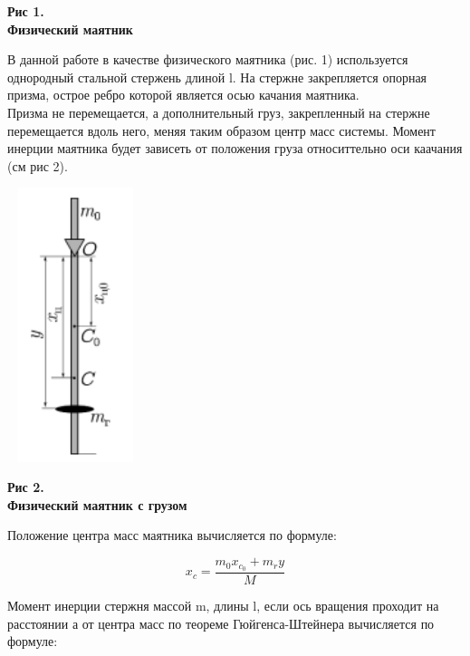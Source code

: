 \begin{flushright}
{\scriptsize \textbf{Рис 1.}\\ \textbf {Физический маятник}}
\end{flushright}

    
    В данной работе в качестве физического маятника (рис. 1)
    используется однородный стальной стержень длиной l. На
    стержне закрепляется опорная призма, острое ребро которой
    является осью качания маятника.\\
    Призма не перемещается, а дополнительный груз, закрепленный на стержне перемещается вдоль него, меняя таким образом центр масс системы. Момент инерции маятника будет зависеть от положения груза относиттельно оси каачания (см рис 2).\\
    
\begin{center}
\includegraphics[width=4cm, height=8cm]{phys_mayat_2}
\end{center}

\begin{flushright}
{\scriptsize \textbf{Рис 2.}\\ \textbf {Физический маятник с грузом}}
\end{flushright}
    
    Положение центра масс маятника вычисляется по формуле:

\begin{equation} \label{центр масс}
    x_{c} = \frac{m_{0}x_{c_0} + m_{r}y}{M}
\end{equation}


    Момент инерции стержня массой m, длины l, если ось вращения проходит на расстоянии а от центра масс по теореме Гюйгенса-Штейнера вычисляется по формуле:
    
